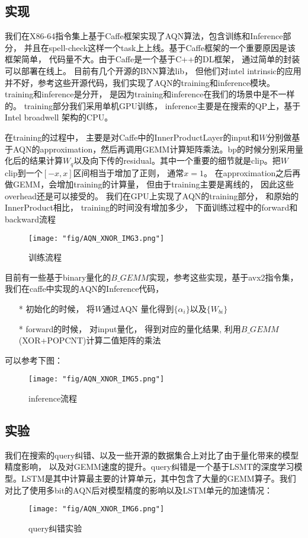 \subsection{实现}
我们在X86-64指令集上基于Caffe框架实现了AQN算法，包含训练和Inference部分， 并且在spell-check这样一个task上上线。基于Caffe框架的一个重要原因是该框架简单， 代码量不大。由于Caffe是一个基于C++的DL框架， 通过简单的封装可以部署在线上。
目前有几个开源的BNN算法lib， 但他们对intel intrinsic的应用并不好，参考这些开源代码，我们实现了AQN的training和inference模块。training和inference是分开， 是因为training和inference在我们的场景中是不一样的。 training部分我们采用单机GPU训练， inference主要是在搜索的QP上，基于Intel broadwell 架构的CPU。

在training的过程中， 主要是对Caffe中的InnerProductLayer的input和$W$分别做基于AQN的approximation，然后再调用GEMM计算矩阵乘法。bp的时候分别采用量化后的结果计算$W_q$以及向下传的residual。其中一个重要的细节就是clip。把$W$ clip到一个$\left[-x, x\right]$区间相当于增加了正则， 通常$x=1$。
在approximation之后再做GEMM，会增加training的计算量， 但由于training主要是离线的， 因此这些overhead还是可以接受的。 我们在GPU上实现了AQN的training部分， 和原始的InnerProduct相比， training的时间没有增加多少， 下面训练过程中的forward和backward流程

\begin{figure}[!h]
  \centering 
    \texttt{[image: "fig/AQN\_XNOR\_IMG3.png"]}
  \caption{训练流程} 
\end{figure}

目前有一些基于binary量化的$B\_GEMM$实现，参考这些实现，基于avx2指令集， 我们在caffe中实现的AQN的Inference代码，
 \begin{itemize}
\item[*]  初始化的时候， 将$W$通过AQN 量化得到$\{\alpha_{i}\}$以及$\{W_{bi}\}$
\item[*]  forward的时候， 对input量化， 得到对应的量化结果, 利用$B\_GEMM$(XOR+POPCNT)计算二值矩阵的乘法
\end{itemize}
可以参考下图：
\begin{figure}[!h]
    \centering
    \texttt{[image: "fig/AQN\_XNOR\_IMG5.png"]}
    \caption{inference流程}
    \label{fig:AQN_XNOR_IMG5}
\end{figure}

\subsection{实验}
我们在搜索的query纠错、以及一些开源的数据集合上对比了由于量化带来的模型精度影响， 以及对GEMM速度的提升。query纠错是一个基于LSMT的深度学习模型。LSTM是其中计算最主要的计算单元，其中包含了大量的GEMM算子。我们对比了使用多bit的AQN后对模型精度的影响以及LSTM单元的加速情况：
\begin{figure}[!h]
    \centering
    \texttt{[image: "fig/AQN\_XNOR\_IMG6.png"]}
    \caption{query纠错实验}
    \label{fig:AQN_XNOR_IMG6}
\end{figure}

